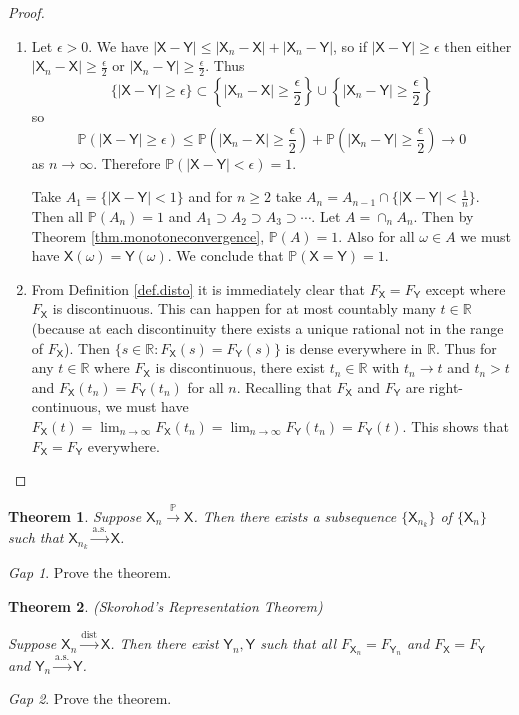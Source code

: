 \documentclass[11pt]{article}
\newcommand{\rv}[1]{\mathsf{#1}}
\newcommand{\p}{\mathbb{P}}
\newcommand{\asto}{\xrightarrow{\text{a.s.}}}
\newcommand{\pto}{\xrightarrow{\p}}
\newcommand{\disto}{\xrightarrow{\text{dist}}}
\newcommand{\RR}{\mathbb{R}}
\theoremstyle{theorem}
\newtheorem{theorem}{Theorem}[section]
\theoremstyle{definition}
\theoremstyle{remark}
\theoremstyle{step}
\theoremstyle{gap}
\newtheorem*{gap}{Gap}
\begin{document}
\begin{proof}\ 
\begin{enumerate}
\item
Let \(\epsilon > 0\).
We have \(|\rv{X}-\rv{Y}| \leq |\rv{X}_n-\rv{X}| + |\rv{X}_n - \rv{Y}|\), so if \(|\rv{X}-\rv{Y}|\geq \epsilon\) then either \(|\rv{X}_n - \rv{X}| \geq \frac{\epsilon}{2}\) or \(|\rv{X}_n - \rv{Y}| \geq \frac{\epsilon}{2}\). Thus \[\{|\rv{X}-\rv{Y}|\geq \epsilon\} \subset \left\{|\rv{X}_n-\rv{X}| \geq \frac{\epsilon}{2}\right\} \cup \left\{|\rv{X}_n - \rv{Y}| \geq \frac{\epsilon}{2}\right\}\]
so
\[\p(|\rv{X}-\rv{Y}|\geq \epsilon) \leq \p\left(|\rv{X}_n-\rv{X}| \geq \frac{\epsilon}{2}\right) + \p\left(|\rv{X}_n - \rv{Y}| \geq \frac{\epsilon}{2}\right) \to 0\]
as \(n \to \infty\). Therefore \(\p(|\rv{X}-\rv{Y}| < \epsilon) = 1\).

Take \(A_1 = \{|\rv{X}-\rv{Y}| < 1\}\) and for \(n \geq 2\) take \(A_n = A_{n-1} \cap \{|\rv{X}-\rv{Y}| < \frac{1}{n}\}\). Then all \(\p(A_n) = 1\) and \(A_1 \supset A_2 \supset A_3 \supset \cdots\). Let \(A = \cap_n A_n\). Then by Theorem \ref{thm.monotoneconvergence}, \(\p(A) = 1\). Also for all \(\omega \in A\) we must have \(\rv{X}(\omega) = \rv{Y}(\omega)\). We conclude that \(\p(\rv{X}=\rv{Y}) = 1\).

\item
From Definition \ref{def.disto} it is immediately clear that \(F_\rv{X} = F_\rv{Y}\) except where \(F_\rv{X}\) is discontinuous. This can happen for at most countably many \(t \in \RR\) (because at each discontinuity there exists a unique rational not in the range of \(F_\rv{X}\)). Then \(\{s \in \RR:F_\rv{X}(s) = F_\rv{Y}(s)\}\) is dense everywhere in \(\RR\). Thus for any \(t\in\RR\) where \(F_\rv{X}\) is discontinuous, there exist \(t_n\in \RR\) with \(t_n \to t\) and \(t_n > t\) and \(F_\rv{X}(t_n) = F_\rv{Y}(t_n)\) for all \(n\). Recalling that \(F_\rv{X}\) and \(F_\rv{Y}\) are right-continuous, we must have \(F_\rv{X}(t) = \lim_{n \to \infty} F_\rv{X}(t_n) = \lim_{n \to \infty} F_\rv{Y}(t_n) = F_\rv{Y}(t) \). This shows that \(F_\rv{X} = F_\rv{Y}\) everywhere.
\end{enumerate}
\end{proof}

\begin{theorem}
Suppose \(\rv{X}_n \pto \rv{X}\). Then there exists a subsequence \(\{\rv{X}_{n_k}\}\) of \(\{\rv{X}_n\}\) such that \(\rv{X}_{n_k} \asto \rv{X}\).
\end{theorem}

\begin{gap}
Prove the theorem.
\end{gap}


\begin{theorem}{(Skorohod's Representation Theorem)}\ 

Suppose \(\rv{X}_n \disto \rv{X}\). Then there exist \(\rv{Y}_n, \rv{Y}\) such that all \(F_{\rv{X}_n} = F_{\rv{Y}_n}\) and \(F_\rv{X} = F_\rv{Y}\) and \(\rv{Y}_n \asto \rv{Y}\).
\end{theorem}

\begin{gap}
Prove the theorem.
\end{gap}
\end{document}

